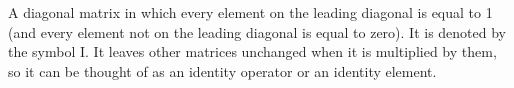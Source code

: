 A diagonal matrix in which every element on the leading diagonal is equal
to 1 (and every element not on the leading diagonal is equal to zero). It
is denoted by the symbol I.
It leaves other matrices unchanged when it is multiplied by them,
so it can be thought of as an identity operator or an identity element.